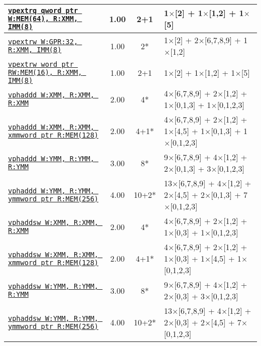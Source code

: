 \documentclass[a4paper,english,fontsize=9]{scrartcl}
\begin{document}
\begin{longtable}{p{}ccL{.25\textwidth}}
  \midrule
  \texttt{\href{https://felixcloutier.com/x86/PEXTRB:PEXTRD:PEXTRQ.html}{vpextrq qword ptr W:MEM(64), R:XMM, IMM(8)}} & 1.00 & 2+1 & 1\(\times\)[2] + 1\(\times\)[1,2] + 1\(\times\)[5] \\
  \midrule
  \texttt{\href{https://felixcloutier.com/x86/PEXTRW.html}{vpextrw W:GPR:32, R:XMM, IMM(8)}} & 1.00 & 2* & 1\(\times\)[2] + 2\(\times\)[6,7,8,9] + 1\(\times\)[1,2] \\
  \midrule
  \texttt{\href{https://felixcloutier.com/x86/PEXTRW.html}{vpextrw word ptr RW:MEM(16), R:XMM, IMM(8)}} & 1.00 & 2+1 & 1\(\times\)[2] + 1\(\times\)[1,2] + 1\(\times\)[5] \\
  \midrule
  \texttt{\href{https://felixcloutier.com/x86/PHADDW:PHADDD.html}{vphaddd W:XMM, R:XMM, R:XMM}} & 2.00 & 4* & 4\(\times\)[6,7,8,9] + 2\(\times\)[1,2] + 1\(\times\)[0,1,3] + 1\(\times\)[0,1,2,3] \\
  \midrule
  \texttt{\href{https://felixcloutier.com/x86/PHADDW:PHADDD.html}{vphaddd W:XMM, R:XMM, xmmword ptr R:MEM(128)}} & 2.00 & 4+1* & 4\(\times\)[6,7,8,9] + 2\(\times\)[1,2] + 1\(\times\)[4,5] + 1\(\times\)[0,1,3] + 1\(\times\)[0,1,2,3] \\
  \midrule
  \texttt{\href{https://felixcloutier.com/x86/PHADDW:PHADDD.html}{vphaddd W:YMM, R:YMM, R:YMM}} & 3.00 & 8* & 9\(\times\)[6,7,8,9] + 4\(\times\)[1,2] + 2\(\times\)[0,1,3] + 3\(\times\)[0,1,2,3] \\
  \midrule
  \texttt{\href{https://felixcloutier.com/x86/PHADDW:PHADDD.html}{vphaddd W:YMM, R:YMM, ymmword ptr R:MEM(256)}} & 4.00 & 10+2* & 13\(\times\)[6,7,8,9] + 4\(\times\)[1,2] + 2\(\times\)[4,5] + 2\(\times\)[0,1,3] + 7\(\times\)[0,1,2,3] \\
  \midrule
  \texttt{\href{https://felixcloutier.com/x86/PHADDSW.html}{vphaddsw W:XMM, R:XMM, R:XMM}} & 2.00 & 4* & 4\(\times\)[6,7,8,9] + 2\(\times\)[1,2] + 1\(\times\)[0,3] + 1\(\times\)[0,1,2,3] \\
  \midrule
  \texttt{\href{https://felixcloutier.com/x86/PHADDSW.html}{vphaddsw W:XMM, R:XMM, xmmword ptr R:MEM(128)}} & 2.00 & 4+1* & 4\(\times\)[6,7,8,9] + 2\(\times\)[1,2] + 1\(\times\)[0,3] + 1\(\times\)[4,5] + 1\(\times\)[0,1,2,3] \\
  \midrule
  \texttt{\href{https://felixcloutier.com/x86/PHADDSW.html}{vphaddsw W:YMM, R:YMM, R:YMM}} & 3.00 & 8* & 9\(\times\)[6,7,8,9] + 4\(\times\)[1,2] + 2\(\times\)[0,3] + 3\(\times\)[0,1,2,3] \\
  \midrule
  \texttt{\href{https://felixcloutier.com/x86/PHADDSW.html}{vphaddsw W:YMM, R:YMM, ymmword ptr R:MEM(256)}} & 4.00 & 10+2* & 13\(\times\)[6,7,8,9] + 4\(\times\)[1,2] + 2\(\times\)[0,3] + 2\(\times\)[4,5] + 7\(\times\)[0,1,2,3] \\

\end{longtable}
\end{document}
